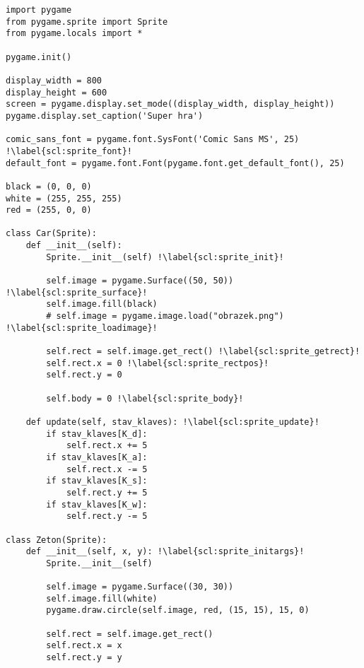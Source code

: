 \begin{minipage}[t]{.45\textwidth}
\begin{code}
\begin{verbatim}
import pygame
from pygame.sprite import Sprite
from pygame.locals import *

pygame.init()

display_width = 800
display_height = 600
screen = pygame.display.set_mode((display_width, display_height))
pygame.display.set_caption('Super hra')

comic_sans_font = pygame.font.SysFont('Comic Sans MS', 25) !\label{scl:sprite_font}!
default_font = pygame.font.Font(pygame.font.get_default_font(), 25)

black = (0, 0, 0)
white = (255, 255, 255)
red = (255, 0, 0)

class Car(Sprite):
    def __init__(self):
        Sprite.__init__(self) !\label{scl:sprite_init}!
        
        self.image = pygame.Surface((50, 50)) !\label{scl:sprite_surface}!
        self.image.fill(black)
        # self.image = pygame.image.load("obrazek.png") !\label{scl:sprite_loadimage}!
        
        self.rect = self.image.get_rect() !\label{scl:sprite_getrect}!
        self.rect.x = 0 !\label{scl:sprite_rectpos}!
        self.rect.y = 0
        
        self.body = 0 !\label{scl:sprite_body}!
    
    def update(self, stav_klaves): !\label{scl:sprite_update}!
        if stav_klaves[K_d]:
            self.rect.x += 5
        if stav_klaves[K_a]:
            self.rect.x -= 5
        if stav_klaves[K_s]:
            self.rect.y += 5
        if stav_klaves[K_w]:
            self.rect.y -= 5

class Zeton(Sprite):
    def __init__(self, x, y): !\label{scl:sprite_initargs}!
        Sprite.__init__(self)
        
        self.image = pygame.Surface((30, 30))
        self.image.fill(white)
        pygame.draw.circle(self.image, red, (15, 15), 15, 0)
        
        self.rect = self.image.get_rect()
        self.rect.x = x
        self.rect.y = y
        
\end{verbatim}

\label{code:grafika_Sprite1}
\end{code}
\end{minipage}
